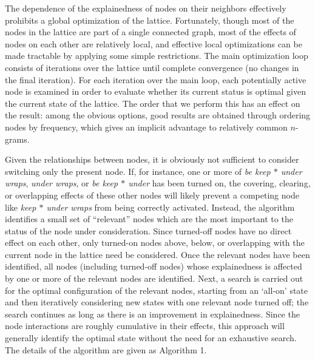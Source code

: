 \documentclass[11pt,letterpaper]{article}
\newcommand{\gap}{$*$\xspace}
\newcommand{\ex}[1]{\textit{#1}\xspace}
\begin{document}
The dependence of the explainedness of nodes on their neighbors effectively prohibits a global optimization of the lattice. Fortunately, though most of the nodes in the lattice are part of a single connected graph, most of the effects of nodes on each other are relatively local, and effective local optimizations can be made tractable by applying some simple restrictions. The main optimization loop consists of iterations over the lattice until complete convergence (no changes in the final iteration). For each iteration over the main loop, each potentially active node is examined in order to evaluate whether its current status is optimal given the current state of the lattice. The order that we perform this has an effect on the result: among the obvious options, good results are obtained through ordering nodes by frequency, which gives an implicit advantage to relatively common $n$-grams.

Given the relationships between nodes, it is obviously not sufficient to consider switching only the present node. If, for instance, one or more of \ex{be keep \gap under wraps}, \ex{under wraps}, or \ex{be keep \gap under} has been turned on, the covering, clearing, or overlapping effects of these other nodes will likely prevent a competing node like \ex{keep \gap under wraps} from being correctly activated. Instead, the algorithm identifies a small set of ``relevant'' nodes which are the most important to the status of the node under consideration. Since turned-off nodes have no direct effect on each other, only turned-on nodes above, below, or overlapping with the current node in the lattice need be considered.  Once the relevant nodes have been identified, all nodes (including turned-off nodes) whose explainedness is affected by one or more of the relevant nodes are identified. Next, a search is carried out for the optimal configuration of the relevant nodes, starting from an `all-on' state and then iteratively considering new states with one relevant node turned off; the search continues as long as there is an improvement in explainedness. Since the node interactions are roughly cumulative in their effects, this approach will generally identify the optimal state without the need for an exhaustive search. The details of the algorithm are given as Algorithm 1.%
\end{document}

